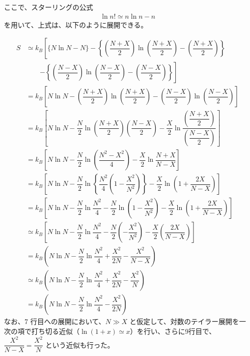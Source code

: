 \documentclass[11pt]{jsarticle}
\begin{document}
\begin{appendix}
ここで、スターリングの公式
\begin{align*}
\ln n! \simeq n \ln n -n
\end{align*}
を用いて、上式は、以下のように展開できる。

\begin{align*}
S 
	&\simeq k_B \left[ \{ N\ln N - N \} - \left\{ \left( \dfrac{N+X}{2} \right)\ln \left( \dfrac{N+X}{2} \right) -\left( \dfrac{N+X}{2} \right) \right\} \right. \\
		&\quad \quad \left. - \left\{ \left( \dfrac{N-X}{2}\right) \ln \left( \dfrac{N-X}{2} \right) - \left( \dfrac{N-X}{2} \right) \right\} \right]\\
	&= k_B \left[ N\ln N - \left( \dfrac{N+X}{2} \right)\ln \left( \dfrac{N+X}{2}\right) - \left( \dfrac{N-X}{2} \right) \ln \left( \dfrac{N-X}{2} \right) \right]\\
	&= k_B \left[ N\ln N - \dfrac{N}{2} \ln \left( \dfrac{N+X}{2} \right)\left( \dfrac{N-X}{2} \right) 
		- \dfrac{X}{2} \ln \dfrac{\left( \dfrac{N+X}{2}\right)}{ \left( \dfrac{N-X}{2} \right) } \right]  \\
	&= k_B \left[ N\ln N - \dfrac{N}{2} \ln \left( \dfrac{N^2-X^2}{4} \right) - \dfrac{X}{2} \ln \dfrac{N + X}{ N - X } \right]  \\
	&= k_B \left[ N\ln N - \dfrac{N}{2} \ln \left\{ \dfrac{N^2}{4}\left(1-\dfrac{X^2}{N^2} \right) \right\} 
	- \dfrac{X}{2} \ln \left( 1 + \dfrac{2X}{N-X} \right) \right]  \\
	&= k_B \left[ N\ln N - \dfrac{N}{2} \ln \dfrac{N^2}{4} - \dfrac{N}{2} \ln \left(1-\dfrac{X^2}{N^2} \right) 
	- \dfrac{X}{2} \ln \left( 1 + \dfrac{2X}{N-X} \right) \right]  \\
	&\simeq k_B \left[ N\ln N - \dfrac{N}{2} \ln \dfrac{N^2}{4} - \dfrac{N}{2}\left(-\dfrac{X^2}{N^2} \right) 
	- \dfrac{X}{2} \left(\dfrac{2X}{N-X} \right) \right]  \\
	&= k_B \left( N\ln N - \dfrac{N}{2} \ln \dfrac{N^2}{4} + \dfrac{X^2}{2N} -\dfrac{X^2}{N - X} \right) \\
	&\simeq k_B \left( N\ln N - \dfrac{N}{2} \ln \dfrac{N^2}{4} + \dfrac{X^2}{2N} -\dfrac{X^2}{N} \right) \\
	&= k_B \left( N\ln N - \dfrac{N}{2} \ln \dfrac{N^2}{4} - \dfrac{X^2}{2N} \right)
\end{align*}
なお、7 行目への展開において、$N \gg X$ と仮定して、対数のテイラー展開を一次の項で打ち切る近似（$\ln(1+x) \simeq x$）を行い、さらに9行目で、$\dfrac{X^2}{N-X} = \dfrac{X^2}{N}$ という近似も行った。


\end{appendix}
\end{document}
